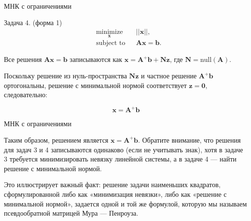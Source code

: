 \documentclass{beamer}
\begin{document}
\begin{frame}{МНК с ограничениями}
	\begin{flushleft}
		
		
		Задача 4. (форма 1)
		\begin{equation}
			\begin{aligned}
				& \underset{\mathbf{x}}{\text{minimize}}
				& & || \mathbf{x} ||, \\
				& \text{subject to}
				& & \mathbf{A} \mathbf{x} = \mathbf{b}.
			\end{aligned}
		\end{equation}
		
		
		Все решения $\mathbf{A} \mathbf{x} = \mathbf{b}$ записываются как $\mathbf{x} = \mathbf{A}^+\mathbf{b} + \mathbf{N}\mathbf{z}$, где $\mathbf{N} = \text{null}(\mathbf{A})$. 
		
		\bigskip
		
		Поскольку решение из нуль-пространства $\mathbf{N}\mathbf{z}$ и частное решение $\mathbf{A}^+\mathbf{b}$ ортогональны, решение с минимальной нормой соответствует $\mathbf{z} = \mathbf{0}$, следовательно:
		
		\begin{equation}
			\mathbf{x} = \mathbf{A}^+\mathbf{b}
		\end{equation}
		
	\end{flushleft}
\end{frame}

\begin{frame}{МНК с ограничениями}
	\begin{flushleft}
		
		
		Таким образом, решением является $\mathbf{x} = \mathbf{A}^+\mathbf{b}$. Обратите внимание, что решения для задач 3 и 4 записываются одинаково (если не учитывать знак), хотя в задаче 3 требуется минимизировать невязку линейной системы, а в задаче 4 — найти решение с минимальной нормой. 
		
		\bigskip
		
		Это иллюстрирует важный факт: решение задачи наименьших квадратов, сформулированной либо как «минимизация невязки», либо как «решение с минимальной нормой», задается одной и той же формулой, которую мы называем псевдообратной матрицей Мура — Пенроуза.
		
		
	\end{flushleft}
\end{frame}
\end{document}
